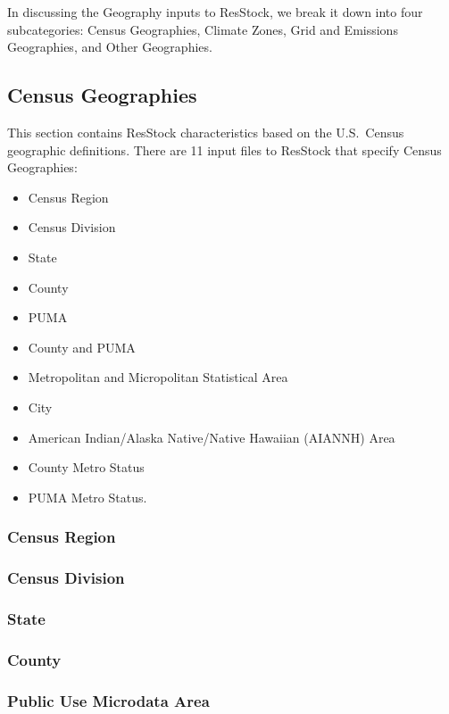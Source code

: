 In discussing the Geography inputs to ResStock, we break it down into four subcategories: Census Geographies, Climate Zones, Grid and Emissions Geographies, and Other Geographies.

\subsection{Census Geographies}
This section contains ResStock characteristics based on the U.S.~Census geographic definitions. There are 11 input files to ResStock that specify Census Geographies:
\begin{itemize}
    \item Census Region
    \item Census Division
    \item State
    \item County
    \item PUMA
    \item County and PUMA
    \item Metropolitan and Micropolitan Statistical Area
    \item City
    \item American Indian/Alaska Native/Native Hawaiian (AIANNH) Area
    \item County Metro Status
    \item PUMA Metro Status.
\end{itemize}

\subsubsection{Census Region}


\subsubsection{Census Division}


\subsubsection{State}


\subsubsection{County}


\subsubsection{Public Use Microdata Area}


